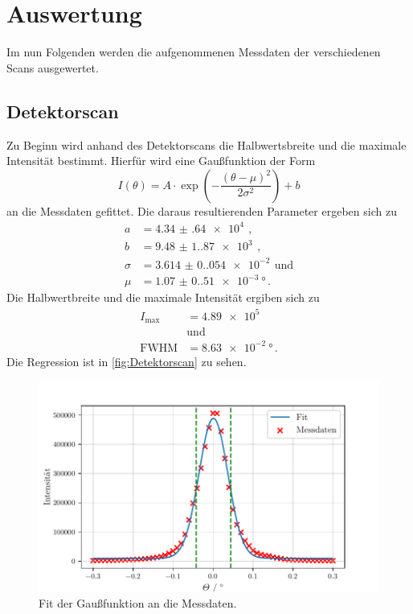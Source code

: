 \section{Auswertung}
\label{sec:Auswertung}

Im nun Folgenden werden die aufgenommenen Messdaten der verschiedenen Scans ausgewertet. 


\subsection{Detektorscan}
\label{sec:Detektorscan}

Zu Beginn wird anhand des Detektorscans die Halbwertsbreite und die maximale Intensität bestimmt.
Hierfür wird eine Gaußfunktion der Form
\begin{equation}
    I(\theta)= A \cdot \exp \left(-\frac{(\theta-\mu)^2}{2 \sigma^2}\right)+b
\end{equation}
an die Messdaten gefittet.
Die daraus resultierenden Parameter ergeben sich zu 
\begin{align*}
    a & = \qty{4.34(64)e4}{} \, , \\
    b & = \qty{9.48(1.87)e3}{} \, , \\
    \sigma & = \qty{3.614(0.054)e-2}{} \, \text{und} \\
    \mu & = \qty{1.07(0.51)e-3}{\degree} \, .
\end{align*}
Die Halbwertbreite und die maximale Intensität ergiben sich zu
\begin{align*}
    I_\text{max} &= \qty{4.89e5}{} \\
    &\text{und} \\
    \text{FWHM} &= \qty{8.63e-2}{\degree} \, .
\end{align*}
Die Regression ist in \autoref{fig:Detektorscan} zu sehen.
\begin{figure}
    \centering
    \includegraphics[width = 0.5 \linewidth]{build/Detektorscan.pdf}
    \caption{Fit der Gaußfunktion an die Messdaten.}
    \label{fig:Detektorscan}
\end{figure}

